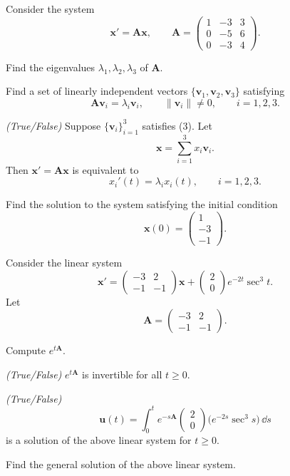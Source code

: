 \documentclass[11pt,oneside]{article}
\begin{document}
\begin{problem}
Consider the system
\[
\mathbf x'=\mathbf A\mathbf x,
\qquad
\mathbf A=
\begin{pmatrix}
1&-3&3\\
0&-5&6\\
0&-3&4
\end{pmatrix}.
\]
\begin{problemsubparts}
\item Find the eigenvalues $\lambda_1,\lambda_2,\lambda_3$ of $\mathbf A$.
\item Find a set of linearly independent vectors $\{\mathbf v_1,\mathbf v_2,\mathbf v_3\}$ satisfying
\[
\mathbf A\mathbf v_i=\lambda_i\mathbf v_i,
\qquad
\|\mathbf v_i\|\ne0,
\qquad i=1,2,3. \tag{3}
\]
\item \textit{(True/False)} Suppose $\{\mathbf v_i\}_{i=1}^3$ satisfies (3). Let
\[
\mathbf x=\sum_{i=1}^3x_i\mathbf v_i.
\]
Then $\mathbf x'=\mathbf A\mathbf x$ is equivalent to
\[
x_i'(t)=\lambda_i x_i(t),
\qquad i=1,2,3.
\]
\item Find the solution to the system satisfying the initial condition
\[
\mathbf x(0)=
\begin{pmatrix}
1\\
-3\\
-1
\end{pmatrix}.
\]
\end{problemsubparts}
\end{problem}

\begin{problem}
Consider the linear system
\[
\mathbf x'=
\begin{pmatrix}
-3&2\\
-1&-1
\end{pmatrix}\mathbf x
+
\begin{pmatrix}
2\\
0
\end{pmatrix}e^{-2t}\sec^3t.
\]
Let
\[
\mathbf A=
\begin{pmatrix}
-3&2\\
-1&-1
\end{pmatrix}.
\]
\begin{problemsubparts}
\item Compute $e^{t\mathbf A}$.
\item \textit{(True/False)} $e^{t\mathbf A}$ is invertible for all $t\ge0$.
\item \textit{(True/False)}
\[
\mathbf u(t)=\int_0^t e^{-s\mathbf A}
\begin{pmatrix}
2\\
0
\end{pmatrix}
\bigl(e^{-2s}\sec^3s\bigr)\,\dd s
\]
is a solution of the above linear system for $t\ge0$.
\item Find the general solution of the above linear system.
\end{problemsubparts}
\end{problem}
\end{document}
